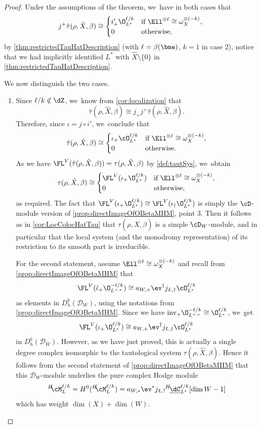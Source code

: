 \begin{proof}
Under the assumptions of the theorem, we~have in both cases that
\[
j^+\hat\tau(\rho, \hat{X}, \beta) \cong
\begin{cases}
i'_+ \O_{L^*}^{\ell/k} &\text{if } \Ell^{\otimes \ell} \cong \omega_X^{\otimes (-k)}, \\
0 & \text{otherwise},
\end{cases}
\]
by \cref{thm:restrictedTauHatDescription} (with $\ell = \beta(\bme)$, $k = 1$ in case $2$), notice that we had implicitly identified $L^*$ with $\hat{X}\setminus \{0\}$ in \cref{thm:restrictedTauHatDescription}.

We now distinguish the two cases.
\begin{enumerate}
\item
Since
$\ell/k\notin \dZ$, we~know from
\cref{cor:localization}
that
\[
\hat{\tau}(\rho, \hat{X},\beta)\cong j_+j^+\hat{\tau}(\rho, \hat{X},\beta).
\]
Therefore, since $\iota=j\circ i'$, we~conclude that
\[
\hat{\tau}(\rho, \hat{X},\beta)\cong 
\begin{cases} \iota_+ \cO_{L^*}^{\ell/k} & \text{if } \Ell^{\otimes \ell} \cong \omega_X^{\otimes (-k)}, \\
0 &\text{otherwise}.
\end{cases}
\]
As we have $\FL^V(\hat\tau(\rho,\hat X, \beta)) = \tau(\rho,\hat X, \beta)$ by \cref{def:tautSys}, we~obtain
\[
\tau(\rho,\hat X, \beta) \cong 
\begin{cases}
\FL^V(\iota_+ \O_{L^*}^{\ell/k})
&\text{if } \Ell^{\otimes \ell} \cong \omega_X^{\otimes (-k)}, \\
0 &\text{otherwise},
\end{cases}
\]
as required. The fact that
$\FL^V(\iota_+ \O_{L^*}^{\ell/k}) \cong \FL^V(\iota_\dag \O_{L^*}^{\ell/k})$ is simply the $\cD$\nobreakdash-mod\-ule version of \cref{prop:directImageOfOBetaMHM}, point 3. Then it follows as in \cref{cor:LocColocHatTau} that $\tau(\rho,\hat{X},\beta)$ is a simple $\cD_W$\nobreakdash-mod\-ule, and in particular that the local system (and the monodromy representation) of its restriction to its smooth part is irreducible.

For the second statement, assume $\Ell^{\otimes \ell} \cong \omega_X^{\otimes (-k)}$ and recall from
\cref{prop:directImageOfOBetaMHM} that
\[
\FL^V(\hat\iota_+ \O_{L^{\vee,*}}^{-\ell/k}) \cong a_{W,+} \ev^\dag j_{L,\dag}\cO_{L^*}^{\ell/k}
\]
as elements in $D^b_h(\mathscr{D}_W)$, using the notations from \cref{prop:directImageOfOBetaMHM}. Since we have $\textup{inv}_+ \O_{L^{\vee,*}}^{-\ell/k} \cong \O_{L^*}^{\ell/k}$, we~get
\[
\FL^V(\iota_+ \O_{L^*}^{\ell/k}) \cong a_{W,+} \ev^\dag j_{L,\dag}\cO_{L^*}^{\ell/k}
\]
in $D^b_h(\mathscr D_W)$. However, as we have just proved, this is actually a single degree complex isomorphic to the tautological system $\tau(\rho,\hat X, \beta)$. Hence it follows from the second statement of \cref{prop:directImageOfOBetaMHM} that this $\mathscr{D}_W$\nobreakdash-mod\-ule underlies the pure complex Hodge module
\[
{^H\!\!}\cM_L^{\ell/k}=H^0({^H\!\!}\cM_L^{\ell/k}) =a_{W,*} \ev^* j_{L,!} {^H\!}\underline{\dC}_{L^*}^{\ell/k}[\dim W -1]
\]
which has weight $\dim(X)+\dim(W)$.


\end{enumerate}
\end{proof}
